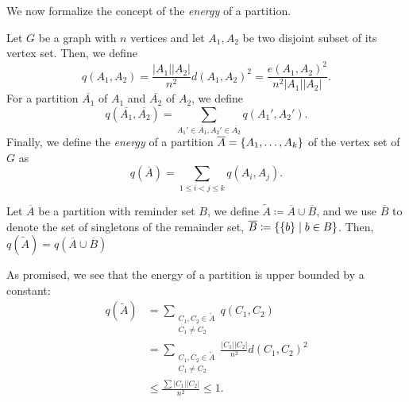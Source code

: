         We now formalize the concept of the \emph{energy} of a partition.

        \begin{definition} \label{def:energy}
            Let $G$ be a graph with $n$ vertices and let $A_1, A_2$ be two disjoint subset of its vertex set.
            Then, we define
            \[
                q(A_1, A_2) = \frac{|A_1||A_2|}{n^2} d(A_1, A_2)^2 = \frac{e(A_1, A_2)^2}{n^2 |A_1| |A_2|}.
            \]
            For a partition $\overline{A_1}$ of $A_1$ and $\overline{A_2}$ of $A_2$, we define
            \[
                q(\overline{A_1}, \overline{A_2}) = \sum_{A_1' \in \overline{A_1}, A_2' \in \overline{A_2}} q(A_1', A_2').
            \]
            Finally, we define the \emph{energy} of a partition $\overline{A} = \{ A_1, \dots, A_k \}$ of the
            vertex set of $G$ as
            \[
                q(\overline{A}) = \sum_{1 \leq i < j \leq k} q(A_i, A_j).
            \]
        \end{definition}

        Let $\overline{A}$ be a partition with reminder set $B$, we define
        $\widetilde{A} \coloneqq \overline{A} \cup \overline{B}$, and we use $\overline{B}$ to denote the set
        of singletons of the remainder set, $\overline{B} \coloneqq \{ \{ b \} \mid b \in B \}$.
        Then, $q(\widetilde{A}) = q(\overline{A} \cup \overline{B})$

        As promised, we see that the energy of a partition is upper bounded by a constant:
        \begin{align} \label{eq:energy_bounded_by_1}
            q(\widetilde{A}) &= \sum_{\substack{C_1, C_2 \in \widetilde{A} \\ C_1 \neq C_2}} q(C_1, C_2) \nonumber \\
                &= \sum_{\substack{C_1, C_2 \in \widetilde{A} \\ C_1 \neq C_2}} \frac{|C_1||C_2|}{n^2} d(C_1, C_2)^2 \nonumber \\
                &\leq \frac{\sum |C_1||C_2|}{n^2} \leq 1.
        \end{align}

